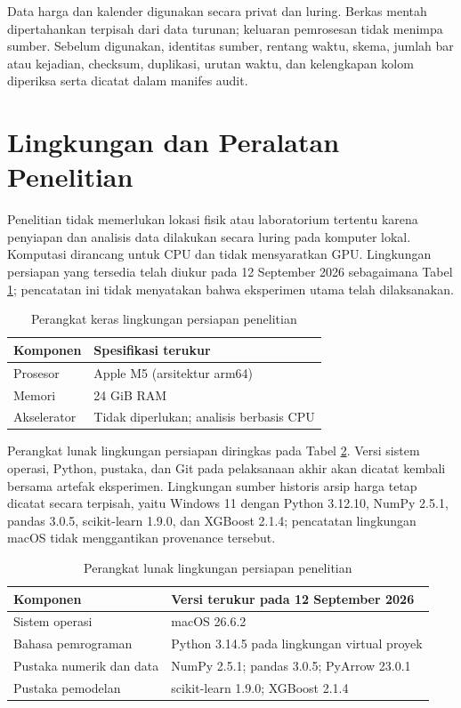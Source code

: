 Data harga dan kalender digunakan secara privat dan luring. Berkas mentah dipertahankan terpisah dari data turunan; keluaran pemrosesan tidak menimpa sumber. Sebelum digunakan, identitas sumber, rentang waktu, skema, jumlah bar atau kejadian, checksum, duplikasi, urutan waktu, dan kelengkapan kolom diperiksa serta dicatat dalam manifes audit.

\section{Lingkungan dan Peralatan Penelitian}

Penelitian tidak memerlukan lokasi fisik atau laboratorium tertentu karena penyiapan dan analisis data dilakukan secara luring pada komputer lokal. Komputasi dirancang untuk CPU dan tidak mensyaratkan GPU. Lingkungan persiapan yang tersedia telah diukur pada 12 September 2026 sebagaimana Tabel \ref{tab:perangkat-keras}; pencatatan ini tidak menyatakan bahwa eksperimen utama telah dilaksanakan.

\begin{table}[htbp]
    \centering
    \caption{Perangkat keras lingkungan persiapan penelitian}
    \label{tab:perangkat-keras}
    \begin{tabular}{ll}
        \hline
        Komponen & Spesifikasi terukur \\
        \hline
        Prosesor & Apple M5 (arsitektur arm64) \\
        Memori & 24 GiB RAM \\
        Akselerator & Tidak diperlukan; analisis berbasis CPU \\
        \hline
    \end{tabular}
\end{table}

Perangkat lunak lingkungan persiapan diringkas pada Tabel \ref{tab:perangkat-lunak}. Versi sistem operasi, Python, pustaka, dan Git pada pelaksanaan akhir akan dicatat kembali bersama artefak eksperimen. Lingkungan sumber historis arsip harga tetap dicatat secara terpisah, yaitu Windows 11 dengan Python 3.12.10, NumPy 2.5.1, pandas 3.0.5, scikit-learn 1.9.0, dan XGBoost 2.1.4; pencatatan lingkungan macOS tidak menggantikan provenance tersebut.

\begin{table}[htbp]
    \centering
    \caption{Perangkat lunak lingkungan persiapan penelitian}
    \label{tab:perangkat-lunak}
    \begin{tabular}{ll}
        \hline
        Komponen & Versi terukur pada 12 September 2026 \\
        \hline
        Sistem operasi & macOS 26.6.2 \\
        Bahasa pemrograman & Python 3.14.5 pada lingkungan virtual proyek \\
        Pustaka numerik dan data & NumPy 2.5.1; pandas 3.0.5; PyArrow 23.0.1 \\
        Pustaka pemodelan & scikit-learn 1.9.0; XGBoost 2.1.4 \\
        \hline
    \end{tabular}
\end{table}

